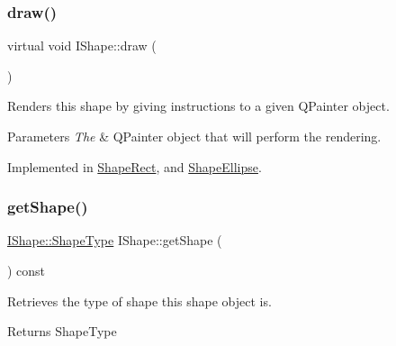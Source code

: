 \mbox{\label{class_i_shape_ad97c626e7e2c9afb9f51efc41b836e6f}} 
\subsubsection{\texorpdfstring{draw()}{draw()}}
{\footnotesize\ttfamily virtual void I\+Shape\+::draw (\begin{DoxyParamCaption}\item[{Q\+Painter \&}]{ }\end{DoxyParamCaption})\hspace{0.3cm}{\ttfamily [pure virtual]}}



Renders this shape by giving instructions to a given Q\+Painter object. 


\begin{DoxyParams}{Parameters}
{\em The} & Q\+Painter object that will perform the rendering. \\
\hline
\end{DoxyParams}


Implemented in \mbox{\hyperlink{class_shape_rect_acc35ed70d85acd941b56cc505b9fae6c}{Shape\+Rect}}, and \mbox{\hyperlink{class_shape_ellipse_ac7f0a33cb5a88c6956f2d876c0c5d313}{Shape\+Ellipse}}.

\mbox{\label{class_i_shape_a92764c3d0b0d12f0f1296cf1e3a392a8}} 
\subsubsection{\texorpdfstring{getShape()}{getShape()}}
{\footnotesize\ttfamily \mbox{\hyperlink{class_i_shape_a8f50993477b5ddb44c0547ef3d547cdc}{I\+Shape\+::\+Shape\+Type}} I\+Shape\+::get\+Shape (\begin{DoxyParamCaption}{ }\end{DoxyParamCaption}) const}



Retrieves the type of shape this shape object is. 

\begin{DoxyReturn}{Returns}
Shape\+Type 
\end{DoxyReturn}
\mbox{\label{class_i_shape_a3d23494cd34e658cc6b39a2e2db0b7fe}} 
